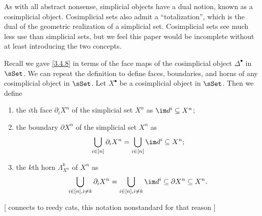 As with all abstract nonsense, simplicial objects have a dual notion, known as a cosimplicial object. Cosimplicial sets also admit a ``totalization'', which is the dual of the geometric realization of a simplicial set. Cosimplicial sets see much less use than simplicial sets, but we feel this paper would be incomplete without at least introducing the two concepts.

\begin{remark}
	Recall we gave \cref{3.4.8} in terms of the face maps of the cosimplicial object $\Delta^{\bullet} $ in $\sSet $. We can repeat the definition to define faces, boundaries, and horns of any cosimplicial object in $\sSet $. Let $X^{\bullet} $ be a cosimplicial object in $\sSet $. Then we define
	\begin{enumerate}
		\item the $i$th face $\partial _iX^n$ of the simplicial set $X^n$ as $\im d^i \subseteq X^n$;
		\item the boundary $\partial X^n$ of the simplicial set $X^n$ as
			\[
				\bigcup_{i\in[n]} \partial _iX^n=\bigcup_{i\in[n]} \im d^i \subseteq X^n;
			\]
		\item the $k$th horn $\Lambda_{X^n} ^k$ of $X^n$ as
			\[
				\bigcup_{i\in[n],i\neq k} \partial _iX^n=\bigcup_{i\in[n],i\neq k} \im d^i \subseteq \partial X^n\subseteq X^n
			.\]
	\end{enumerate}
	[ connects to reedy cats, this notation nonstandard for that reason ]
\end{remark}

